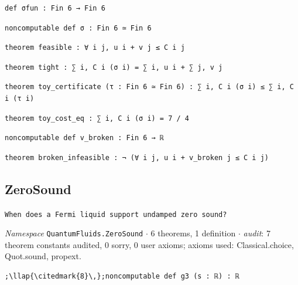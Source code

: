 \begin{lstlisting}[style=leancat]
def σfun : Fin 6 → Fin 6
\end{lstlisting}

\begin{lstlisting}[style=leancat]
noncomputable def σ : Fin 6 ≃ Fin 6
\end{lstlisting}

\begin{lstlisting}[style=leancat]
theorem feasible : ∀ i j, u i + v j ≤ C i j
\end{lstlisting}

\begin{lstlisting}[style=leancat]
theorem tight : ∑ i, C i (σ i) = ∑ i, u i + ∑ j, v j
\end{lstlisting}

\begin{lstlisting}[style=leancat]
theorem toy_certificate (τ : Fin 6 ≃ Fin 6) : ∑ i, C i (σ i) ≤ ∑ i, C i (τ i)
\end{lstlisting}

\begin{lstlisting}[style=leancat]
theorem toy_cost_eq : ∑ i, C i (σ i) = 7 / 4
\end{lstlisting}

\begin{lstlisting}[style=leancat]
noncomputable def v_broken : Fin 6 → ℝ
\end{lstlisting}

\begin{lstlisting}[style=leancat]
theorem broken_infeasible : ¬ (∀ i j, u i + v_broken j ≤ C i j)
\end{lstlisting}

\subsection{ZeroSound}\label{appA:ZeroSound}
{\footnotesize\raggedright\texttt{When does a Fermi liquid support undamped zero sound?}\par}
{\footnotesize\raggedright\emph{Namespace} \texttt{QuantumFluids.\allowbreak{}ZeroSound} $\cdot$ 6 theorems, 1 definition $\cdot$ \emph{audit}: 7 theorem constants audited, 0 sorry, 0 user axioms; axioms used: Classical.choice, Quot.sound, propext.\par}
\vspace{1pt}
\begin{lstlisting}[style=leancat]
;\llap{\citedmark{8}\,};noncomputable def g3 (s : ℝ) : ℝ
\end{lstlisting}

